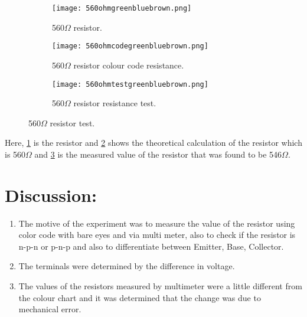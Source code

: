 \documentclass[a4paper, 14pt]{extarticle}
\begin{document}
            \begin{figure}[htbp]
            \centering
                \begin{subfigure}[h]{0.3\textwidth}
                \centering
                    \texttt{[image: 560ohmgreenbluebrown.png]}
                    \caption{560$\Omega$ resistor.}
                    \label{fig:subfig15}
                \end{subfigure}
                \hfill
                \begin{subfigure}[H]{0.3\textwidth}
                \centering
                    \texttt{[image: 560ohmcodegreenbluebrown.png]}
                    \caption{560$\Omega$ resistor colour code resistance.}
                    \label{fig:subfig16}
                \end{subfigure}
                \hfill
                \begin{subfigure}[h]{0.3\textwidth}
                \centering
                    \texttt{[image: 560ohmtestgreenbluebrown.png]}
                    \caption{560$\Omega$ resistor resistance test.}
                    \label{fig:subfig17}
                \end{subfigure}
                \caption{560$\Omega$ resistor test.}
                \label{fig:mainfig6}
            \end{figure}
            Here, \ref{fig:subfig15} is the resistor and \ref{fig:subfig16} shows the theoretical calculation of the resistor which is 560$\Omega$ and \ref{fig:subfig17} is the measured value of the resistor that was found to be 546$\Omega$.

    \newpage
    
    \section{Discussion:}
        \begin{enumerate}
            \item The motive of the experiment was to measure the value of the resistor using color code with bare eyes and via multi meter, also to check if the resistor is n-p-n or p-n-p and also to differentiate between Emitter, Base, Collector.
            \item The terminals were determined by the difference in voltage.
            \item The values of the resistors measured by multimeter were a little different from the colour chart and it was determined that the change was due to mechanical error.
        \end{enumerate}
    
\end{document}

